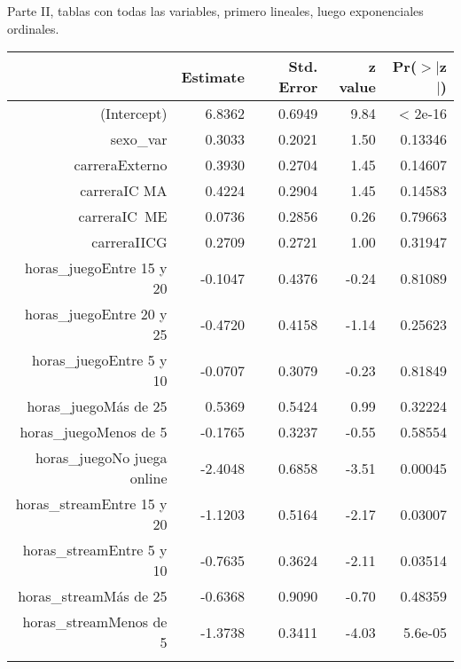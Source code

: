 \documentclass[11pt]{article}
\begin{document}
\newpage

Parte II, tablas con todas las variables, primero lineales, luego exponenciales ordinales.

\begin{center}
\begin{table}[ht]
\centering
\begin{tabular}{rrrrr}
 \hline
& Estimate & Std. Error & z value & Pr($>$$|$z$|$) \\
 \hline
(Intercept)                                               &  6.8362  &    0.6949 &  9.84 & < 2e-16\\
sexo\_var &                                                   0.3033  &    0.2021  & 1.50  &0.13346\\
carreraExterno  &                                          0.3930      &0.2704   &1.45  &0.14607\\
carreraIC MA    &                                        0.4224   &   0.2904  & 1.45  &0.14583\\
carreraIC\ ME     &                                        0.0736     & 0.2856  & 0.26  &0.79663\\
carreraIICG        &                                        0.2709    &  0.2721  & 1.00 & 0.31947\\
horas\_juegoEntre 15 y 20       &                            -0.1047   &   0.4376  &-0.24 & 0.81089\\
horas\_juegoEntre 20 y 25     &                              -0.4720  &    0.4158 & -1.14 & 0.25623\\
horas\_juegoEntre 5 y 10       &                             -0.0707     & 0.3079 & -0.23  &0.81849\\
horas\_juegoMás de 25                    &                    0.5369    &  0.5424  & 0.99 & 0.32224\\
horas\_juegoMenos de 5             &                         -0.1765   &   0.3237 & -0.55 & 0.58554\\
horas\_juegoNo juega online   &                              -2.4048    &  0.6858  &-3.51 & 0.00045\\
horas\_streamEntre 15 y 20    &                              -1.1203 &     0.5164  &-2.17 & 0.03007\\
horas\_streamEntre 5 y 10      &                             -0.7635   &   0.3624  &-2.11 & 0.03514\\
horas\_streamMás de 25            &                          -0.6368 &     0.9090  &-0.70 & 0.48359\\
horas\_streamMenos de 5                  &                   -1.3738  &    0.3411 & -4.03 & 5.6e-05\\
$$
\end{tabular}
\end{table}
\end{center}
\end{document}
